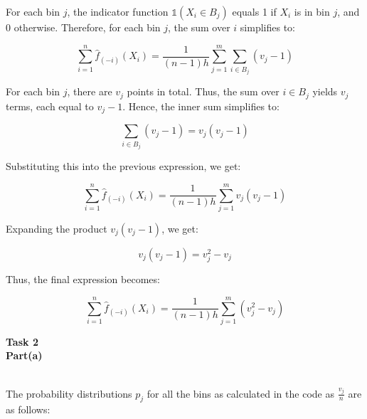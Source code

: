 \documentclass[a4paper,12pt,answers]{exam}
\begin{document}
\begin{questions}
\begin{solution}
For each bin \( j \), the indicator function \( \mathds{1}(X_i \in B_j) \) equals 1 if \( X_i \) is in bin \( j \), and 0 otherwise. Therefore, for each bin \( j \), the sum over \( i \) simplifies to:

\[
\sum_{i=1}^n \hat{f}_{(-i)}(X_i) = \frac{1}{(n-1)h} \sum_{j=1}^m \sum_{i \in B_j} (v_j - 1)
\]


For each bin \( j \), there are \( v_j \) points in total. Thus, the sum over \( i \in B_j \) yields \( v_j \) terms, each equal to \( v_j - 1 \). Hence, the inner sum simplifies to:

\[
\sum_{i \in B_j} (v_j - 1) = v_j(v_j - 1)
\]

Substituting this into the previous expression, we get:

\[
\sum_{i=1}^n \hat{f}_{(-i)}(X_i) = \frac{1}{(n-1)h} \sum_{j=1}^m v_j(v_j - 1)
\]

Expanding the product \( v_j(v_j - 1) \), we get:

\[
v_j(v_j - 1) = v_j^2 - v_j
\]

Thus, the final expression becomes:

\[
\sum_{i=1}^n \hat{f}_{(-i)}(X_i) = \frac{1}{(n-1)h} \sum_{j=1}^m \left( v_j^2 - v_j \right)
\]
\end{solution}
\textbf{Task 2}\\
\textbf{Part(a)}
\begin{solution}\\
    The probability distributions $p_j$ for all the bins as calculated in the code as $\frac{v_j}{n}$ are as follows:\\
    

\end{solution}
\end{questions}
\end{document}
